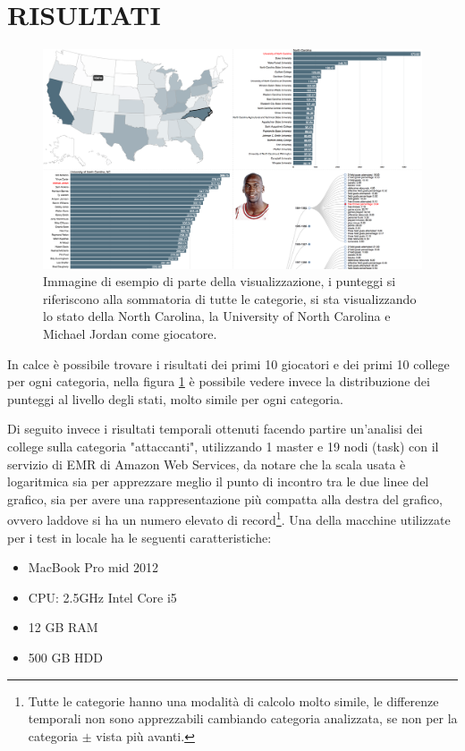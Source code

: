 \documentclass[10.5pt,a4paper,twocolumn]{article}
\begin{document}
\section{RISULTATI}

\begin{figure}
	\centering
	\includegraphics[width=0.9\linewidth]{vis}
	\caption{Immagine di esempio di parte della visualizzazione, i punteggi si riferiscono alla sommatoria di tutte le categorie, si sta visualizzando lo stato della North Carolina, la University of North Carolina e Michael Jordan come giocatore.}
	\label{fig:vis}
\end{figure}

In calce è possibile trovare i risultati dei primi 10 giocatori e dei primi 10 college per ogni categoria, nella figura \ref{fig:vis} è possibile vedere invece la distribuzione dei punteggi al livello degli stati, molto simile per ogni categoria.

Di seguito invece i risultati temporali ottenuti facendo partire un'analisi dei college sulla categoria "attaccanti", utilizzando 1 master e 19 nodi (task) con il servizio di EMR di Amazon Web Services, da notare che la scala usata è logaritmica sia per apprezzare meglio il punto di incontro tra le due linee del grafico, sia per avere una rappresentazione più compatta alla destra del grafico, ovvero laddove si ha un numero elevato di record\footnote{Tutte le categorie hanno una modalità di calcolo molto simile, le differenze temporali non sono apprezzabili cambiando categoria analizzata, se non per la categoria $\pm$ vista più avanti.}. Una della macchine utilizzate per i test in locale ha le seguenti caratteristiche:

\begin{itemize}
	\setlength\itemsep{0.2em}
	\item MacBook Pro mid 2012
	\item CPU: 2.5GHz Intel Core i5
	\item 12 GB RAM
	\item 500 GB HDD
\end{itemize}
\end{document}
